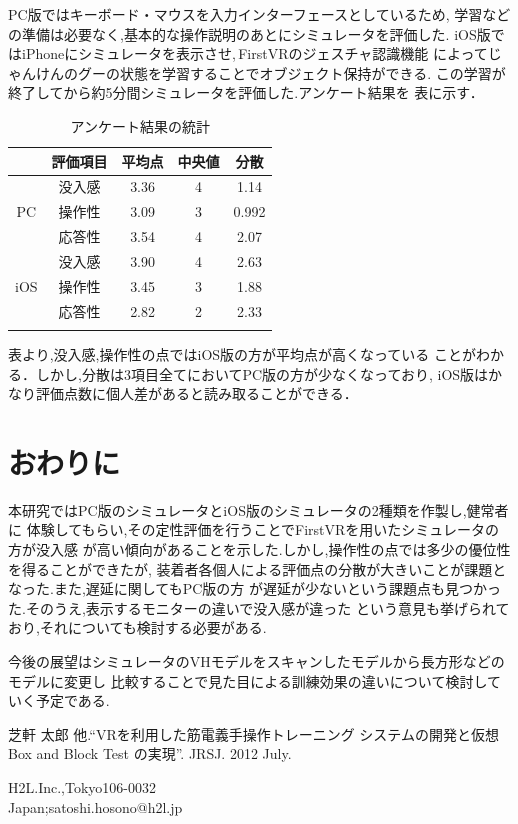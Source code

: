 \documentclass{ltjsarticle}
\begin{document}
		PC版ではキーボード・マウスを入力インターフェースとしているため,
		学習などの準備は必要なく,基本的な操作説明のあとにシミュレータを評価した.
		iOS版ではiPhoneにシミュレータを表示させ,\,FirstVRのジェスチャ認識機能
		によってじゃんけんのグーの状態を学習することでオブジェクト保持ができる.
		この学習が終了してから約5分間シミュレータを評価した.アンケート結果を
		表に示す．
		
		\vspace{-10pt}
		\begin{table}[H]
		\begin{center}
		\caption{アンケート結果の統計}
		\label{tab:resoult}
		\begin{tabular}{cc|ccc} \Hline
		&評価項目&平均点&中央値&分散\\ \hline
		&没入感&3.36&4&1.14\\
		PC&操作性&3.09&3&0.992\\
		&応答性&3.54&4&2.07\\ \hline
		&没入感&3.90&4&2.63\\
		iOS&操作性&3.45&3&1.88\\
		&応答性&2.82&2&2.33\\ \Hline
		\end{tabular}
		\end{center}
		\end{table}

		表より,没入感,操作性の点ではiOS版の方が平均点が高くなっている
		ことがわかる．しかし,分散は3項目全てにおいてPC版の方が少なくなっており,
		iOS版はかなり評価点数に個人差があると読み取ることができる．


\section{おわりに}
	本研究ではPC版のシミュレータとiOS版のシミュレータの2種類を作製し,健常者に
	体験してもらい,その定性評価を行うことでFirstVRを用いたシミュレータの方が没入感
	が高い傾向があることを示した.しかし,操作性の点では多少の優位性を得ることができたが,
	装着者各個人による評価点の分散が大きいことが課題となった.また,遅延に関してもPC版の方
	が遅延が少ないという課題点も見つかった.そのうえ,表示するモニターの違いで没入感が違った
	という意見も挙げられており,それについても検討する必要がある.

	今後の展望はシミュレータのVHモデルをスキャンしたモデルから長方形などのモデルに変更し
	比較することで見た目による訓練効果の違いについて検討していく予定である.


\begin{thebibliography}{99}%
	\begin{spacing}{0.8}

			芝軒 太郎 他.``VRを利用した筋電義手操作トレーニング
			システムの開発と仮想 Box and Block Test の実現''. 
			JRSJ. 2012 July.

			H2L.Inc.,Tokyo106-0032\\Japan;satoshi.hosono@h2l.jp

	\end{spacing}
\end{thebibliography}
\end{document}
